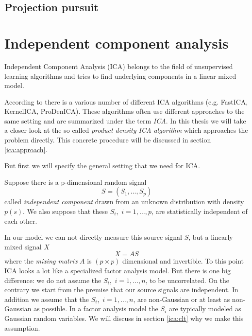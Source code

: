\documentclass[12pt, a4paper]{article}
\numberwithin{equation}{section}
\numberwithin{figure}{section}
\numberwithin{table}{section}
\begin{document}
	
	\subsection{Projection pursuit }
	
	\newpage
	\section{Independent component analysis} \label{ica}
	Independent Component Analysis (ICA) belongs to the field of unsupervised learning algorithms and tries to find underlying components in a linear mixed model.
	
	According to \citet{estimating-smi-ica} there is a various number of different ICA algorithms (e.g. FastICA, KernelICA, ProDenICA). 
	These algorithms often use different approaches to the same setting and are summarized under the term \textit{ICA}.
	In this thesis we will take a closer look at the so called \textit{product density ICA algorithm} which approaches the problem directly. %
	This concrete procedure will be discussed in section \ref{ica:approach}.
	
	But first we will specify the general setting that we need for ICA.
	
	Suppose there is a p-dimensional random signal 
	\begin{equation*}
	S = (S_1,\dots, S_p)
	\end{equation*}
	called \textit{independent component} drawn from an unknown distribution with density \mbox{$p(s)$}.
	We also suppose that these \mbox{${S_i}$, $ i=1,\dots,p$}, are statistically independent of each other. 
	
	In our model we can not directly measure this source signal $S$, but a linearly mixed signal $X$
	\begin{equation}
	X=AS
	\end{equation}
	where the \textit{mixing matrix} $A$ is \mbox{$(p \times p)$} dimensional and invertible. %
	To this point ICA looks a lot like a specialized factor analysis model.
	But there is one big difference: we do not assume the \mbox{$S_i$, $i=1,\dots,n$}, to be uncorrelated.
	On the contrary we start from the premise that our source signals are independent.
	In addition we assume that the \mbox{$S_i$, $i=1,\dots,n$}, are non-Gaussian or at least as non-Gaussian as possible.
	In a factor analysis model the \mbox{$S_i$} are typically modeled as Gaussian random variables.
	We will discuss in section \ref{ica:clt} why we make this assumption.%
	
\end{document}
